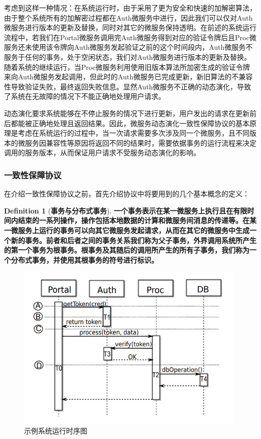 \documentclass[a4paper, 12pt]{article}
\theoremstyle{definition}
\newtheorem{definition}{Definition}[section]
\begin{document}
考虑到这样一种情况：在系统运行时，由于采用了更为安全和快速的加解密算法，由于整个系统所有的加解密过程都在Auth微服务中进行，因此我们可以仅对Auth微服务进行版本的更新及替换，同时对其它的微服务保持透明。在前述的系统运行流程中，若我们在Portal微服务调用完Auth微服务得到对应的验证令牌后且Proc微服务还未使用该令牌向Auth微服务发起验证之前的这个时间段内，Auth微服务不服务于任何的事务，处于空闲状态，我们对Auth微服务进行版本的更新及替换。随着系统的继续运行，当Proc微服务利用使用旧版本算法所加密生成的验证令牌来向Auth微服务发起调用，但此时的Auth微服务已完成更新，新旧算法的不兼容性导致验证失败，最终返回失败信息。显然Auth微服务不正确的动态演化，导致了系统在无故障的情况下不能正确地处理用户请求。

动态演化要求系统能够在不停止服务的情况下进行更新，用户发出的请求在更新前后都能被正确地处理且返回结果。因此，微服务动态演化一致性保障协议的基本原理是考虑在系统运行的过程中，当一次请求需要多次涉及同一个微服务，且不同版本的微服务因兼容性等原因将返回不同的结果时，需要依据事务的运行流程来决定调用的服务版本，从而保证用户请求不受服务动态演化的影响。

\subsubsection{一致性保障协议}
在介绍一致性保障协议之前，首先介绍协议中将要用到的几个基本概念的定义：

\theoremstyle{definition}
\begin{definition}[\textbf{事务与分布式事务}]
\label{definition:transaction}
\textbf{一个事务表示在某一微服务上执行且在有限时间内结束的一系列操作，操作包括本地数据的计算和微服务间消息的传递等。在某一微服务上运行的事务可以向其它微服务发起请求，从而在其它的微服务中生成一个新的事务。前者和后者之间的事务关系我们称为父子事务，外界调用系统所产生的第一个事务为根事务。根事务及其随后的调用所产生的所有子事务，我们称为一个分布式事务，并使用其根事务的符号进行标识。}
\end{definition}

\begin{figure}[!ht]
 \centering
 \includegraphics[height=8cm]{images/ExampleProcess.png}
 \caption{示例系统运行时序图}
 \label{fig:ExampleProcess}
\end{figure}
\end{document}
